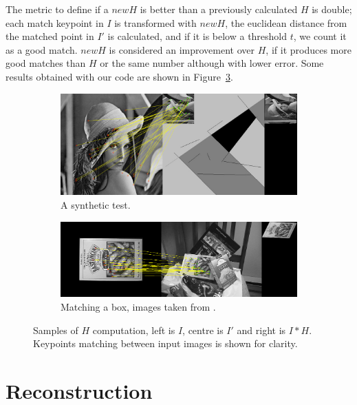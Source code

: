 \documentclass[12pt]{article}
\begin{document}
The metric to define if a $newH$ is better than a previously calculated $H$ is double; each match keypoint in $I$ is transformed with $newH$, the euclidean distance from the matched point in $I'$ is calculated, and if it is below a threshold $t$, we count it as a good match.
$newH$ is considered an improvement over $H$, if it produces more good matches than $H$ or the same number although with lower error.
Some results obtained with our code are shown in Figure~\ref{fig:ransacSample}.

\begin{figure}[htbp!]
        \centering
        \begin{subfigure}[b]{0.6\textwidth}
                \includegraphics[width=\textwidth]{images/ransac2}
                \caption{A synthetic test.}
                \label{fig:ransac1}
        \end{subfigure}    
        \begin{subfigure}[b]{0.6\textwidth}
                \includegraphics[width=\textwidth]{images/ransac1}
                \caption{Matching a box, images taken from \cite{Lowe2004}.}
                \label{fig:ransac2}
        \end{subfigure} 
        \caption{Samples of $H$ computation, left is $I$, centre is $I'$ and right is $I * H$. Keypoints matching between input images is shown for clarity.}\label{fig:ransacSample}
\end{figure}

\FloatBarrier
\section{Reconstruction}
\end{document}
